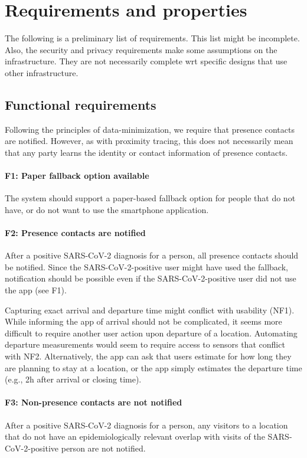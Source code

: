 \section{Requirements and properties}

The following is a preliminary list of requirements. This list might be incomplete. Also, the security and privacy requirements make some assumptions on the infrastructure. They are not necessarily complete wrt specific designs that use other infrastructure.

\subsection{Functional requirements}
Following the principles of data-minimization, we require that presence contacts are notified. However, as with proximity tracing, this does not necessarily mean that any party learns the identity or contact information of presence contacts.

\paragraph{F1: Paper fallback option available} The system should support a paper-based fallback option for people that do not have, or do not want to use the smartphone application. 

\paragraph{F2: Presence contacts are notified} After a positive SARS-CoV-2 diagnosis for a person, all presence contacts should be notified. Since the SARS-CoV-2-positive user might have used the fallback, notification should be possible even if the SARS-CoV-2-positive user did not use the app (see F1).

 Capturing exact arrival and departure time might conflict with usability (NF1). While informing the app of arrival should not be complicated, it seems more difficult to require another user action upon departure of a location. Automating departure measurements would seem to require access to sensors that conflict with NF2. Alternatively, the app can ask that users estimate for how long they are planning to stay at a location, or the app simply estimates the departure time (e.g., 2h after arrival or closing time).

\paragraph{F3: Non-presence contacts are not notified} After a positive SARS-CoV-2 diagnosis for a person, any visitors to a location that do not have an epidemiologically relevant overlap with visits of the SARS-CoV-2-positive person are not notified.

